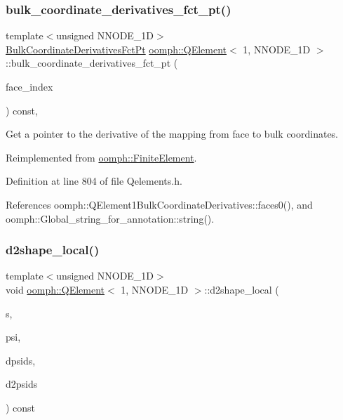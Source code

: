 \subsubsection{\texorpdfstring{bulk\+\_\+coordinate\+\_\+derivatives\+\_\+fct\+\_\+pt()}{bulk\_coordinate\_derivatives\_fct\_pt()}}
{\footnotesize\ttfamily template$<$unsigned N\+N\+O\+D\+E\+\_\+1D$>$ \\
\hyperlink{namespaceoomph_a0a75fbfa1139f00cf88adeee835c8fe5}{Bulk\+Coordinate\+Derivatives\+Fct\+Pt} \hyperlink{classoomph_1_1QElement}{oomph\+::\+Q\+Element}$<$ 1, N\+N\+O\+D\+E\+\_\+1D $>$\+::bulk\+\_\+coordinate\+\_\+derivatives\+\_\+fct\+\_\+pt (\begin{DoxyParamCaption}\item[{const int \&}]{face\+\_\+index }\end{DoxyParamCaption}) const\hspace{0.3cm}{\ttfamily [inline]}, {\ttfamily [virtual]}}

Get a pointer to the derivative of the mapping from face to bulk coordinates. 

Reimplemented from \hyperlink{classoomph_1_1FiniteElement_a8b29bbf8e20cf2ccf91674ca09ed80aa}{oomph\+::\+Finite\+Element}.



Definition at line 804 of file Qelements.\+h.



References oomph\+::\+Q\+Element1\+Bulk\+Coordinate\+Derivatives\+::faces0(), and oomph\+::\+Global\+\_\+string\+\_\+for\+\_\+annotation\+::string().

\mbox{\label{classoomph_1_1QElement_3_011_00_01NNODE__1D_01_4_ab8d03d9559cd49a994212f49a4b2cd3e}} 
\subsubsection{\texorpdfstring{d2shape\+\_\+local()}{d2shape\_local()}}
{\footnotesize\ttfamily template$<$unsigned N\+N\+O\+D\+E\+\_\+1D$>$ \\
void \hyperlink{classoomph_1_1QElement}{oomph\+::\+Q\+Element}$<$ 1, N\+N\+O\+D\+E\+\_\+1D $>$\+::d2shape\+\_\+local (\begin{DoxyParamCaption}\item[{const \hyperlink{classoomph_1_1Vector}{Vector}$<$ double $>$ \&}]{s,  }\item[{\hyperlink{classoomph_1_1Shape}{Shape} \&}]{psi,  }\item[{\hyperlink{classoomph_1_1DShape}{D\+Shape} \&}]{dpsids,  }\item[{\hyperlink{classoomph_1_1DShape}{D\+Shape} \&}]{d2psids }\end{DoxyParamCaption}) const\hspace{0.3cm}{\ttfamily [virtual]}}



